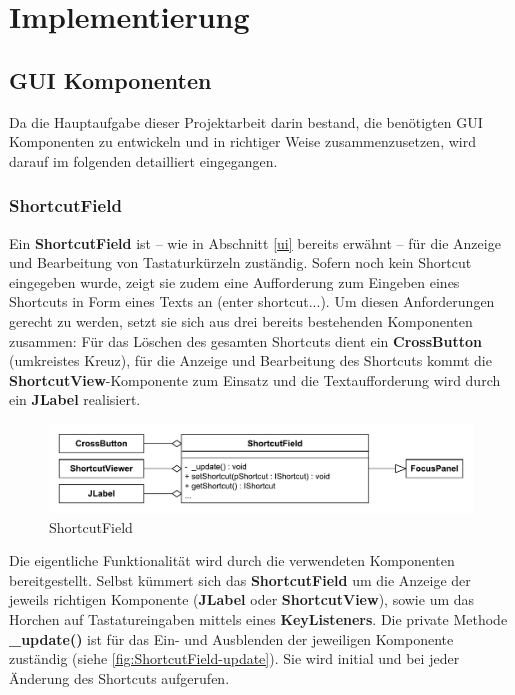 \section{Implementierung}

\subsection{GUI Komponenten}

Da die Hauptaufgabe dieser Projektarbeit darin bestand, die benötigten GUI Komponenten zu entwickeln und in richtiger Weise zusammenzusetzen, wird darauf im folgenden detailliert eingegangen.

\subsubsection{ShortcutField}

Ein \textbf{ShortcutField} ist -- wie in Abschnitt \ref{ui} bereits erwähnt -- für die Anzeige und Bearbeitung von Tastaturkürzeln zuständig. Sofern noch kein Shortcut eingegeben wurde, zeigt sie zudem eine Aufforderung zum Eingeben eines Shortcuts in Form eines Texts an (\glqq enter shortcut...\grqq). Um diesen Anforderungen gerecht zu werden, setzt sie sich aus drei bereits bestehenden Komponenten zusammen: Für das Löschen des gesamten Shortcuts dient ein \textbf{CrossButton} (umkreistes Kreuz), für die Anzeige und Bearbeitung des Shortcuts kommt die \textbf{ShortcutView}-Komponente zum Einsatz und die Textaufforderung wird durch ein \textbf{JLabel} realisiert.

\begin{figure}[H]
	\centering
	\includegraphics[width=0.8\linewidth]{../graphic/diagrams/CD_ShortcutField/ShortcutField}
	\caption{ShortcutField}
	\label{fig:shortcutfield}
\end{figure}

Die eigentliche Funktionalität wird durch die verwendeten Komponenten bereitgestellt. Selbst kümmert sich das \textbf{ShortcutField} um die Anzeige der jeweils richtigen Komponente (\textbf{JLabel} oder \textbf{ShortcutView}), sowie um das Horchen auf Tastatureingaben mittels eines \textbf{KeyListeners}. Die private Methode \textbf{\_update()} ist für das Ein- und Ausblenden der jeweiligen Komponente zuständig (siehe \autoref{fig:ShortcutField-update}). Sie wird initial und bei jeder Änderung des Shortcuts aufgerufen.

